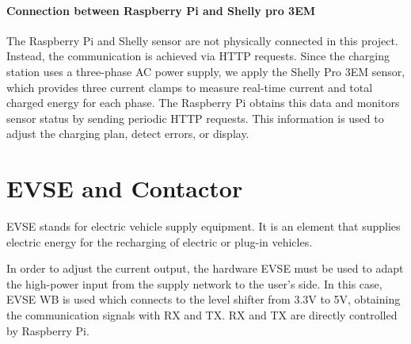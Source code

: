 \documentclass[
	english,
	ruledheaders=section,%
	class=report,%
	thesis={type=Report},%
	accentcolor=9c,%
	custommargins=true,%
	marginpar=false,%
	parskip=half-,%
	fontsize=11pt,%
	logofile={img/tuda_logo.pdf}, %
]{tudapub}
\begin{document}
\paragraph{Connection between Raspberry Pi and Shelly pro 3EM}
The Raspberry Pi and Shelly sensor are not physically connected in this project. Instead, the communication is achieved via HTTP requests. Since the charging station uses a three-phase AC power supply, we apply the Shelly Pro 3EM sensor, which provides three current clamps to measure real-time current and total charged energy for each phase. The Raspberry Pi obtains this data and monitors sensor status by sending periodic HTTP requests. This information is used to adjust the charging plan, detect errors, or display.


\section{EVSE and Contactor}
\label{sec: EVSE and Contactor}

EVSE stands for electric vehicle supply equipment. It is an element that supplies electric energy for the recharging of electric or plug-in vehicles. 

In order to adjust the current output, the hardware EVSE must be used to adapt the high-power input from the supply network to the user's side. In this case, EVSE WB is used which connects to the level shifter from 3.3V to 5V, obtaining the communication signals with \ac{RX} and \ac{TX}. \ac{RX} and \ac{TX} are directly controlled by Raspberry Pi. 

\end{document}
